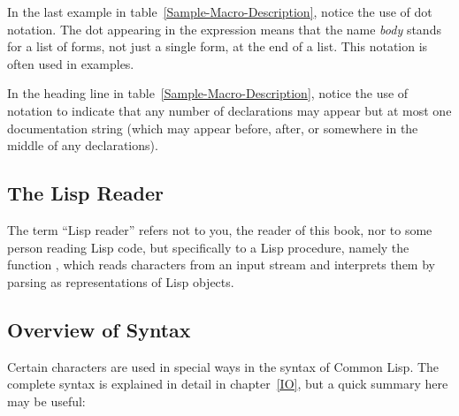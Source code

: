 In the last example in table~\ref{Sample-Macro-Description}, notice the
use of dot notation.  The dot appearing in the expression
 means that the name \emph{body} stands
for a list of forms, not just a single form, at the end of a list.  This
notation is often used in examples.

\begin{newer}
In the heading line in table~\ref{Sample-Macro-Description}, notice the
use of \Mchoice{~} notation to indicate that any number of declarations
may appear but at most one documentation string (which may appear before,
after, or somewhere in the middle of any declarations).
\end{newer}

\subsection{The Lisp Reader}

The term ``Lisp reader'' refers not to you, the reader of this book,
nor to some person reading Lisp code, but specifically
to a Lisp procedure, namely the function ,
which reads characters from an input stream and interprets them by parsing
as representations of Lisp objects.

\subsection{Overview of Syntax}

Certain characters are used in special ways in the syntax of Common Lisp.
The complete syntax is explained in detail in chapter~\ref{IO},
but a quick summary here may be useful:

